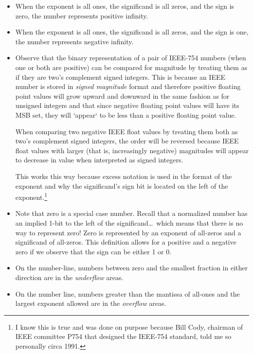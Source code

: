 \begin{itemize}
\item When the exponent is all ones, the significand is all zeros, and
the sign is zero, the number represents positive infinity.

\item When the exponent is all ones, the significand is all zeros, and
the sign is one, the number represents negative infinity.

\item Observe that the binary representation of a pair of IEEE-754 numbers
(when one or both are positive) can be compared for magnitude 
by treating them as if they are two's complement signed integers.  
This is because an IEEE number is stored in {\em signed magnitude} format and 
therefore positive floating point values will grow upward and downward in the 
same fashion as for unsigned integers and that since negative floating point 
values will have its MSB set, they will `appear` to be less than a positive 
floating point value.  

When comparing two negative IEEE float values by treating them both as two's
complement signed integers, the order will be reversed because IEEE float values 
with larger (that is, increasingly negative) magnitudes will appear to decrease 
in value when interpreted as signed integers.

This works this way because excess notation is used in the format of the 
exponent and why the significand's sign bit is located on the left of 
the exponent.\footnote{I know this is true and was done on purpose because
Bill Cody, chairman of IEEE committee P754 that designed the IEEE-754 standard, 
told me so personally circa 1991.}

\item Note that zero is a special case number.  Recall that a normalized
number has an implied 1-bit to the left of the significand\ldots\ which
means that there is no way to represent zero!
Zero is represented by an exponent of all-zeros and a significand of 
all-zeros.  This definition allows for a positive and a negative zero 
if we observe that the sign can be either 1 or 0.

\item On the number-line, numbers between zero and the smallest fraction in 
either direction are in the {\em \gls{underflow}} areas.

\item On the number line, numbers greater than the mantissa of all-ones and the 
largest exponent allowed are in the {\em \gls{overflow}} areas.


\end{itemize}
